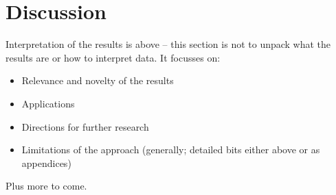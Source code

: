 \chapter{Discussion}

Interpretation of the results is above – this section is not to unpack what the results are or how to interpret data.  It focusses on:
\begin{itemize}
\item Relevance and novelty of the results
\item Applications
\item Directions for further research
\item Limitations of the approach (generally; detailed bits either above or as appendices)
\end{itemize}
Plus more to come.


